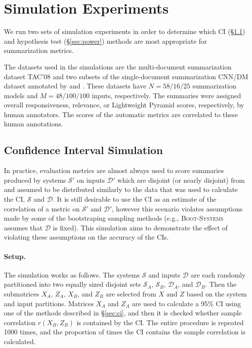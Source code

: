 \section{Simulation Experiments}
\label{sec:simulations}
We run two sets of simulation experiments in order to determine which CI (\S\ref{sec:ci_simulations}) and hypothesis test (\S\ref{sec:power}) methods are most appropriate for summarization metrics.

The datasets used in the simulations are the multi-document summarization dataset TAC'08 \citep{DangOw08} and two subsets of the single-document summarization CNN/DM dataset \citep{NZSGX16} annotated by \citet{FKMSR21} and \citet{BGALN20}.
These datasets have $N=58/16/25$ summarization models and $M=48/100/100$ inputs, respectively.
The summaries were assigned overall responsiveness, relevance, or Lightweight Pyramid \citep{SGGRPBAD19} scores, respectively, by human annotators. The scores of the automatic metrics are correlated to these human annotations.

\subsection{Confidence Interval Simulation}
\label{sec:ci_simulations}
In practice, evaluation metrics are almost always used to score summaries produced by systems $\mathcal{S}'$ on inputs $\mathcal{D}'$ which are disjoint (or nearly disjoint) from and assumed to be distributed similarly to the data that was used to calculate the CI, $\mathcal{S}$ and $\mathcal{D}$.
It is still desirable to use the CI as an estimate of the correlation of a metric on $\mathcal{S}'$ and $\mathcal{D}'$, however this scenario violates assumptions made by some of the bootstraping sampling methods (e.g., \textsc{Boot-Systems} assumes that $\mathcal{D}$ is fixed).
This simulation aims to demonstrate the effect of violating these assumptions on the accuracy of the CIs.

\paragraph{Setup.}
The simulation works as follows.
The systems $\mathcal{S}$ and inputs $\mathcal{D}$ are each randomly partitioned into two equally sized disjoint sets $\mathcal{S}_A$, $\mathcal{S}_B$, $\mathcal{D}_A$, and $\mathcal{D}_B$.
Then the submatrices $X_A$, $Z_A$, $X_B$, and $Z_B$ are selected from $X$ and $Z$ based on the system and input partitions.
Matrices $X_A$ and $Z_A$ are used to calculate a 95\% CI using one of the methods described in \S\ref{sec:ci}, and then it is checked whether sample correlation $r(X_B, Z_B)$ is contained by the CI.
The entire procedure is repeated 1000 times, and the proportion of times the CI contains the sample correlation is calculated.

